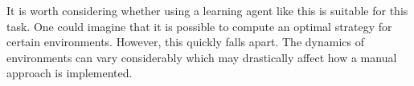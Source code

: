 % 
% 
% 
% 
% 

It is worth considering whether using a learning agent like this is suitable for this task.
One could imagine that it is possible to compute an optimal strategy for certain environments.
However, this quickly falls apart.
The dynamics of environments can vary considerably which may drastically affect how a manual approach is implemented.

